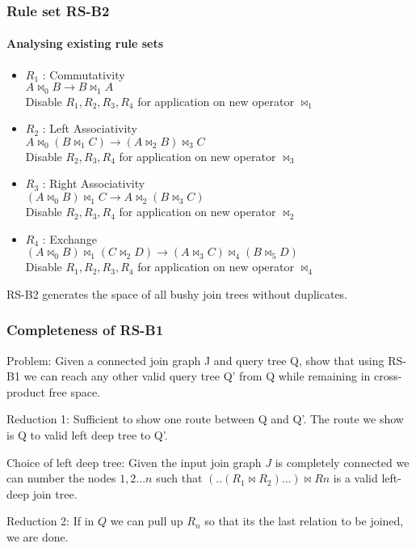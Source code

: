 \documentclass{beamer}
\begin{document}
  \begin{frame}
  \frametitle{Rule set RS-B2}
  \framesubtitle{Analysing existing rule sets}
\begin{itemize}
	\item $R_{1}$ : Commutativity \\ $A \bowtie_{0} B \rightarrow B \bowtie_{1} A$ \\
	Disable 	$R_{1}, R_{2}, R_{3}, R_{4}$ for application on new operator $\bowtie_{1}$
	\item $R_{2}$ : Left Associativity \\ $A \bowtie_{0} (B \bowtie_{1} C) \rightarrow (A \bowtie_{2} B) \bowtie_{3} C$ \\ 
	Disable 	$R_{2}, R_{3}, R_{4}$ for application  on new operator $\bowtie_{3}$	
	\item $R_{3}$ : Right Associativity \\ $(A \bowtie_{0} B) \bowtie_{1} C \rightarrow A \bowtie_{2} (B \bowtie_{3} C)$ \\
	Disable $R_{2}, R_{3}, R_{4}$ for application on new operator $\bowtie_{2}$	
	\item $R_{4}$ : Exchange \\ $(A \bowtie_{0} B) \bowtie_{1} (C \bowtie_{2} D) \rightarrow (A \bowtie_{3} C) \bowtie_{4} (B \bowtie_{5} D)$ \\
	Disable 	$R_{1}, R_{2}, R_{3}, R_{4}$ for application on new operator $\bowtie_{4}$
\end{itemize}  

   RS-B2 generates the space of all bushy join trees without duplicates.
  \end{frame}

  \begin{frame}
  \frametitle{Completeness of RS-B1}
  Problem: Given a connected join graph J and query tree Q, show that using RS-B1 we can reach any other valid query tree Q' from Q while remaining in cross-product free space.  \vspace{\baselineskip}
  
  Reduction 1: Sufficient to show  one route between Q and Q'. The route we show is Q to valid left deep tree to Q'. \vspace{\baselineskip}
  
  Choice of left deep tree: Given the input join graph $J$ is completely connected we can number the nodes $1,2...n$ such that $(..(R_{1}\bowtie R_{2})...)\bowtie R{n}$ is a valid left-deep join tree. \vspace{\baselineskip}
  
  Reduction 2: If in $Q$ we can pull up $R_{n}$ so that its the last relation to be joined, we are done.
  
  \end{frame}
  
\end{document}
